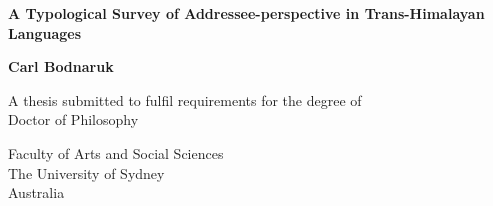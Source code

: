 \begin{titlepage}
    \begin{center}
        \vspace*{1cm}
            
        \huge
        \textbf{A Typological Survey of Addressee-perspective in Trans-Himalayan Languages}
            
        \vspace{0.5cm}

            
        \vspace{1.5cm}
            
        \textbf{Carl Bodnaruk}
            
        \vfill
            
        A thesis submitted to fulfil requirements for the degree of \\
        Doctor of Philosophy
            
        \vspace{2cm}
            
        \Large
        Faculty of Arts and Social Sciences\\
        The University of Sydney\\
        Australia\\
            
    \end{center}
\end{titlepage}